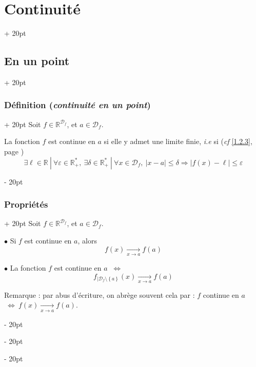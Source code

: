\documentclass[a4paper, 12pt, twoside]{article}
\newcommand{\R}{\mathbb{R}} %
\newcommand{\tendsto}[1]{\xrightarrow[#1]{}}
\newcommand{\set}[1]{\left\{ #1 \right\}}
\newcommand{\abs}[1]{\left\lvert #1 \right\rvert}
\newcommand{\ssi}{\ \Leftrightarrow \ }
\renewcommand{\le}{\leqslant}
\newcommand{\ep}{\varepsilon}
\newcommand{\ind}[1][20pt]{\advance\leftskip + #1}
\newcommand{\deind}[1][20pt]{\advance\leftskip - #1}
\newenvironment{indt}[2][20pt]{#2 \par \ind[#1]}{\par \deind} %
\begin{document}
    \begin{indt}{\section{Continuité}}
        \begin{indt}{\subsection{En un point}}
            \begin{indt}{\subsubsection{Définition (\textit{continuité en un point})}}
                Soit $f \in \R^{\mathcal D_f}$, et $a \in \mathcal D_f$.

                La fonction $f$ est continue en $a$ si elle y admet une limite finie, \textit{i.e} si (\textit{cf} \ref{1.2.3}, page \pageref{1.2.3})
                \[
                    \exists \ell \in \R\ |\
                    \forall \ep \in \R_+^*,\
                    \exists \delta \in \R_+^*\ |\
                    \forall x \in \mathcal D_f,\
                    \abs{x - a} \le \delta
                    \Rightarrow
                    \abs{f(x) - \ell} \le \ep
                \]
            \end{indt}

            \vspace{12pt}
            
            \begin{indt}{\subsubsection{Propriétés}}
                Soit $f \in \R^{\mathcal D_f}$, et $a \in \mathcal D_f$.

                $\bullet$ Si $f$ est continue en $a$, alors
                \[
                    f(x) \tendsto{x \to a} f(a)
                \]

                $\bullet$ La fonction $f$ est continue en $a$ $\ssi$
                \[
                    f_{|\mathcal D_f \setminus \set a}(x) \tendsto{x \to a} f(a)
                \]

                Remarque : par abus d'écriture, on abrège souvent cela par : $f$ continue en $a$ $\ssi f(x) \tendsto{x \to a} f(a)$.
            \end{indt}


\end{indt}
\end{indt}
\end{document}
